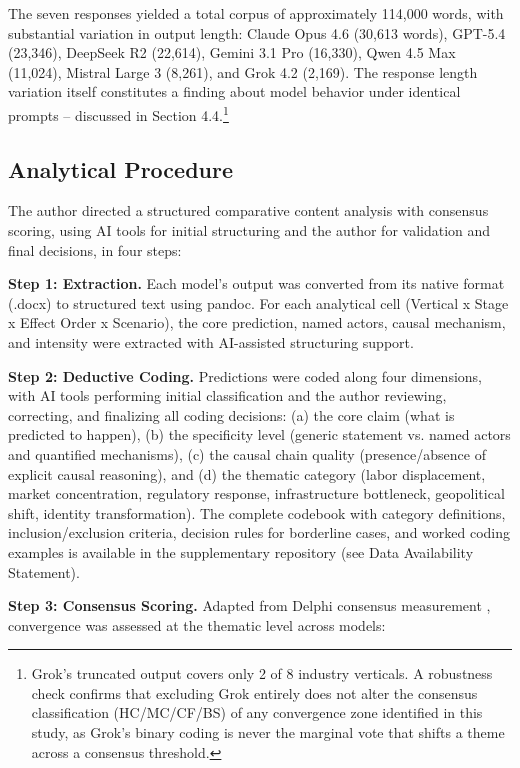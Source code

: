 \documentclass[preprint,review,12pt]{elsarticle}
\begin{document}
The seven responses yielded a total corpus of approximately 114,000 words, with substantial variation in output length: Claude Opus 4.6 (30,613 words), GPT-5.4 (23,346), DeepSeek R2 (22,614), Gemini 3.1 Pro (16,330), Qwen 4.5 Max (11,024), Mistral Large 3 (8,261), and Grok 4.2 (2,169). The response length variation itself constitutes a finding about model behavior under identical prompts -- discussed in Section 4.4.\footnote{Grok's truncated output covers only 2 of 8 industry verticals. A robustness check confirms that excluding Grok entirely does not alter the consensus classification (HC/MC/CF/BS) of any convergence zone identified in this study, as Grok's binary coding is never the marginal vote that shifts a theme across a consensus threshold.}


\subsection{Analytical Procedure}
\label{sec:analytical_procedure}

The author directed a structured comparative content analysis with consensus scoring, using AI tools for initial structuring and the author for validation and final decisions, in four steps:

\textbf{Step 1: Extraction.} Each model's output was converted from its native format (.docx) to structured text using pandoc. For each analytical cell (Vertical x Stage x Effect Order x Scenario), the core prediction, named actors, causal mechanism, and intensity were extracted with AI-assisted structuring support.

\textbf{Step 2: Deductive Coding.} Predictions were coded along four dimensions, with AI tools performing initial classification and the author reviewing, correcting, and finalizing all coding decisions: (a) the core claim (what is predicted to happen), (b) the specificity level (generic statement vs. named actors and quantified mechanisms), (c) the causal chain quality (presence/absence of explicit causal reasoning), and (d) the thematic category (labor displacement, market concentration, regulatory response, infrastructure bottleneck, geopolitical shift, identity transformation). The complete codebook with category definitions, inclusion/exclusion criteria, decision rules for borderline cases, and worked coding examples is available in the supplementary repository (see Data Availability Statement).

\textbf{Step 3: Consensus Scoring.} Adapted from Delphi consensus measurement \citep{vondergracht2012delphi}, convergence was assessed at the thematic level across models:
\end{document}
